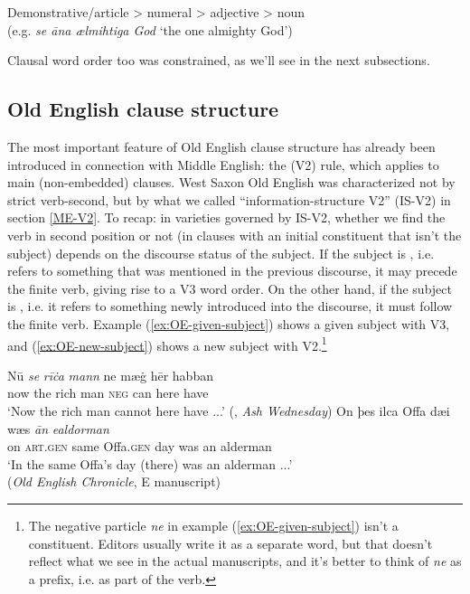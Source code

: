 \begin{exe}
    \ex\label{ex:OE-nominal-word-order} Demonstrative/article > numeral > adjective > noun\\
    (e.g. \emph{se āna ælmihtiga God} `the one almighty God')
\end{exe}

\noindent Clausal word order too was constrained, as we'll see in the next subsections.

\subsection{Old English clause structure}\label{OE-clauses}

The most important feature of Old English clause structure has already been introduced in connection with Middle English: the  (V2) rule, which applies to main (non-embedded) clauses. West Saxon Old English was characterized not by strict verb-second, but by what we called ``information-structure V2'' (IS-V2) in section \ref{ME-V2}. To recap: in varieties governed by IS-V2, whether we find the verb in second position or not (in clauses with an initial constituent that isn't the subject) depends on the discourse status of the subject. If the subject is , i.e. refers to something that was mentioned in the previous discourse, it may precede the finite verb, giving rise to a V3 word order. On the other hand, if the subject is , i.e. it refers to something newly introduced into the discourse, it must follow the finite verb. Example (\ref{ex:OE-given-subject}) shows a given subject with V3, and (\ref{ex:OE-new-subject}) shows a new subject with V2.\footnote{The negative particle \emph{ne} in example (\ref{ex:OE-given-subject}) isn't a constituent. Editors usually write it as a separate word, but that doesn't reflect what we see in the actual manuscripts, and it's better to think of \emph{ne} as a prefix, i.e. as part of the verb.}

\begin{exe}
    \ex\label{ex:OE-given-subject}
    \gll Nū \emph{se} \emph{rīċa} \emph{mann} ne mæġ hēr habban\\
    now the rich man \textsc{neg} can here have\\
    \trans `Now the rich man cannot here have ...' \hfill (, \emph{Ash Wednesday})
    \ex\label{ex:OE-new-subject}
    \gll On þes ilca Offa dæi wæs \emph{ān} \emph{ealdorman}\\
    on \textsc{art.gen} same Offa.\textsc{gen} day was an alderman\\
    \trans `In the same Offa's day (there) was an alderman ...' \\(\emph{Old English Chronicle}, E manuscript)
\end{exe}

